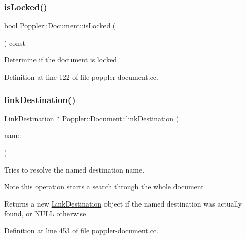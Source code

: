 \subsubsection{\texorpdfstring{is\+Locked()}{isLocked()}}
{\footnotesize\ttfamily bool Poppler\+::\+Document\+::is\+Locked (\begin{DoxyParamCaption}\item[{void}]{ }\end{DoxyParamCaption}) const}

Determine if the document is locked 

Definition at line 122 of file poppler-\/document.\+cc.

\mbox{\label{class_poppler_1_1_document_adce7c161b57d9d8a89888697da1d8c90}} 
\subsubsection{\texorpdfstring{link\+Destination()}{linkDestination()}}
{\footnotesize\ttfamily \hyperlink{class_poppler_1_1_link_destination}{Link\+Destination} $\ast$ Poppler\+::\+Document\+::link\+Destination (\begin{DoxyParamCaption}\item[{const Q\+String \&}]{name }\end{DoxyParamCaption})}

Tries to resolve the named destination {\ttfamily name}.

\begin{DoxyNote}{Note}
this operation starts a search through the whole document
\end{DoxyNote}
\begin{DoxyReturn}{Returns}
a new \hyperlink{class_poppler_1_1_link_destination}{Link\+Destination} object if the named destination was actually found, or N\+U\+LL otherwise 
\end{DoxyReturn}


Definition at line 453 of file poppler-\/document.\+cc.

\mbox{\label{class_poppler_1_1_document_a89330667f1fbc13cdc481cc61f417c82}} 
